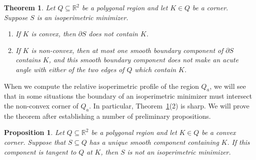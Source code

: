 \documentclass[leqno]{article}
\numberwithin{equation}{section}
\newtheorem{theorem}[equation]{Theorem}
\theoremstyle{definition}
\theoremstyle{remark}
\theoremstyle{plain}
\newtheorem{proposition}[equation]{Proposition}
\begin{document}
\begin{theorem}\label{thm:corner}
Let $Q\subseteq \mathbb{R}^2$ be a polygonal region and let $K\in Q$ be a corner. Suppose $S$ is an isoperimetric minimizer. \begin{enumerate}\item If $K$ is convex, then $\partial S$ does not contain $K$.

\item  If $K$ is non-convex, then at most one smooth boundary component of $\partial S$ contains $K$, and this smooth boundary component does not make an acute angle with either of the two edges of $Q$ which contain $K$.
\end{enumerate}
\end{theorem}

When we compute the relative isoperimetric profile of the region $Q_a$, we will see that in some situations the boundary of an isoperimetric minimizer must intersect the non-convex corner of $Q_a$.  In particular, Theorem~\ref{thm:corner}(2) is sharp.  We will prove the theorem after establishing a number of preliminary propositions.  

\begin{proposition}\label{prop:circleTangentToSide} Let $Q\subseteq\mathbb{R}^2$ be a polygonal region and let $K\in Q$ be a convex corner.  Suppose that $S\subseteq Q$ has a unique smooth component containing $K$.  If this component is tangent to $Q$ at $K$, then $S$ is not an isoperimetric minimizer.
\end{proposition}
\end{document}
